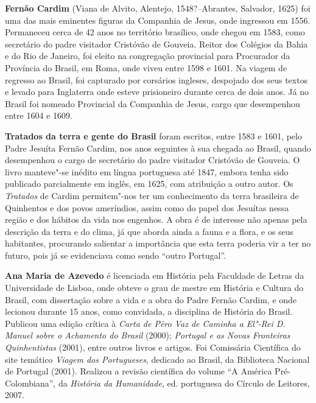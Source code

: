 

\textbf{Fernão Cardim} (Viana de Alvito, Alentejo, 1548?--Abrantes, Salvador, 1625) foi uma das mais eminentes figuras da 
Companhia de Jesus, onde ingressou em 1556. Permaneceu cerca de 42 anos no território brasílico, onde chegou em 1583, como secretário do padre visitador Cristóvão de Gouveia. Reitor dos Colégios da Bahia e do Rio de Janeiro, 
foi eleito na congregação provincial para Procurador da Província do Brasil, em Roma, onde viveu entre 1598 e 1601. 
Na viagem de regresso ao Brasil, foi 
capturado por corsários ingleses, despojado dos seus textos e levado para Inglaterra onde esteve prisioneiro 
durante cerca de dois anos. Já no Brasil foi nomeado Provincial da Companhia de Jesus, cargo que 
desempenhou entre 1604 e 1609. 

\textbf{Tratados da terra e gente do Brasil} foram escritos, entre 1583 e 1601, 
pelo Padre Jesuíta Fernão Cardim, nos anos seguintes à sua chegada ao Brasil, 
quando desempenhou o cargo de secretário do padre visitador Cristóvão de Gouveia. O livro manteve"-se inédito 
em língua portuguesa até 1847, embora tenha sido publicado parcialmente em inglês, em 1625, com atribuição
a outro autor. 
Os \textit{Tratados} de Cardim permitem"-nos ter um conhecimento da terra brasileira de Quinhentos e dos povos ameríndios, assim como do papel dos Jesuítas nessa região e dos hábitos da vida nos engenhos. 
A obra é de interesse não apenas pela descrição da terra e do clima, já que aborda ainda a fauna e a flora, e os seus 
habitantes, procurando salientar a importância que esta terra poderia vir a ter no futuro, pois já se evidenciava como 
sendo ``outro Portugal''. 

\textbf{Ana Maria de Azevedo} é licenciada em História pela Faculdade de Letras da Universidade de Lisboa, 
onde obteve o grau de mestre em História e Cultura do Brasil, com dissertação sobre a vida e a obra 
do Padre Fernão Cardim, e onde lecionou durante 15 anos, como convidada, a disciplina de História do Brasil. 
Publicou uma edição crítica à \textit{Carta de Pêro Vaz de Caminha 
a El"-Rei D. Manuel sobre o Achamento do Brasil} (2000); \textit{Portugal e as Novas Fronteiras Quinhentistas} 
(2001), entre outros livros e artigos. Foi Comissária Científica do site temático \textit{Viagem dos Portugueses}, 
dedicado ao Brasil, da Biblioteca Nacional de Portugal (2001). Realizou a revisão científica do volume ``A América Pré-Colombiana'', da \textit{História da Humanidade}, ed. portuguesa do Círculo de Leitores, 2007.


